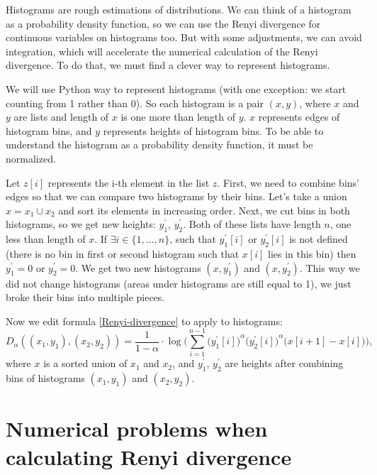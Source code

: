 \documentclass[a4paper, 12pt]{article}
\theoremstyle{definition}
\begin{document}
Histograms are rough estimations of distributions. We can think of a histogram as a probability density function, so we can use the Renyi divergence for continuous variables on histograms too. But with some adjustments, we can avoid integration, which will accelerate the numerical calculation of the Renyi divergence. To do that, we must find a clever way to represent histograms.

We will use Python way to represent histograms (with one exception: we start counting from 1 rather than 0). So each histogram is a pair $(x,y)$, where $x$ and $y$ are lists and length of $x$ is one more than length of $y$. $x$ represents edges of histogram bins, and $y$ represents heights of histogram bins. To be able to understand the histogram as a probability density function, it must be normalized.

Let $z[i]$ represents the i-th element in the list $z$. First, we need to combine bins' edges so that we can compare two histograms by their bins. Let's take a union $x = x_1 \cup x_2$ and sort its elements in increasing order. Next, we cut bins in both histograms, so we get new heights: $y_1^\prime$, $y_2^\prime$. Both of these lists have length $n$, one less than length of $x$. If $\exists i \in \{1, \ldots, n\}$, such that $y_1^\prime[i]$ or $y_2^\prime[i]$ is not defined (there is no bin in first or second histogram such that $x[i]$ lies in this bin) then $y_1^\prime = 0$ or $y_2^\prime = 0$. We get two new histograms $(x, y_1^\prime)$ and $(x, y_2^\prime)$. This way we did not change histograms (areas under histograms are still equal to 1), we just broke their bins into multiple pieces.

Now we edit formula \eqref{Renyi-divergence} to apply to histograms:
\begin{equation}\label{Renyi-divergence-hist}
	D_\alpha ((x_1, y_1), (x_2, y_2)) = \frac{1}{1-\alpha} \cdot \log \Big(\sum_{i=1}^{n-1} {\big(y_1^\prime{[i]}\big)}^\alpha {\big(y_2^\prime{[i]}\big)}^\alpha \big(x{[i+1]}-x{[i]}\big)\Big),
\end{equation}
where $x$ is a sorted union of $x_1$ and $x_2$, and $y_1^\prime$, $y_2^\prime$ are heights after combining bins of histograms $(x_1, y_1)$ and $(x_2,y_2)$.

\pagebreak

\section{Numerical problems when calculating Renyi divergence}
\end{document}
